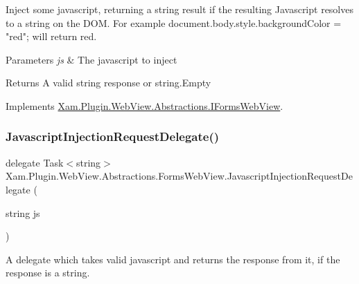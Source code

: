 Inject some javascript, returning a string result if the resulting Javascript resolves to a string on the D\+OM. For example \textquotesingle{}document.\+body.\+style.\+background\+Color = "red";\textquotesingle{} will return \textquotesingle{}red\textquotesingle{}. 


\begin{DoxyParams}{Parameters}
{\em js} & The javascript to inject\\
\hline
\end{DoxyParams}
\begin{DoxyReturn}{Returns}
A valid string response or string.\+Empty
\end{DoxyReturn}


Implements \hyperlink{interface_xam_1_1_plugin_1_1_web_view_1_1_abstractions_1_1_i_forms_web_view}{Xam.\+Plugin.\+Web\+View.\+Abstractions.\+I\+Forms\+Web\+View}.

\mbox{\label{class_xam_1_1_plugin_1_1_web_view_1_1_abstractions_1_1_forms_web_view_ab996fc2e09bce6f42e697e8faccea20c}} 
\subsubsection{\texorpdfstring{Javascript\+Injection\+Request\+Delegate()}{JavascriptInjectionRequestDelegate()}}
{\footnotesize\ttfamily delegate Task$<$string$>$ Xam.\+Plugin.\+Web\+View.\+Abstractions.\+Forms\+Web\+View.\+Javascript\+Injection\+Request\+Delegate (\begin{DoxyParamCaption}\item[{string}]{js }\end{DoxyParamCaption})}



A delegate which takes valid javascript and returns the response from it, if the response is a string. 


